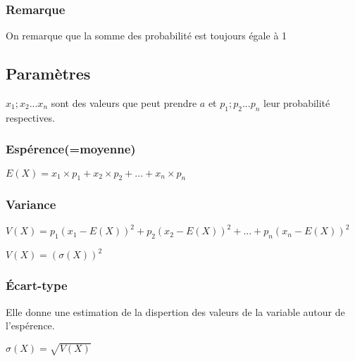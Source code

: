 \documentclass[a4paper,twoside,10pt,french,twocolumn]{scrartcl}
\begin{document}
\subsubsection{Remarque}
On remarque que la somme des probabilité est toujours égale à 1
\subsection{Paramètres}
$x_1;x_2...x_n$ sont des valeurs que peut prendre $a$ et $p_1;p_2...p_n$ leur probabilité respectives.
\subsubsection{Espérence\:(=\:moyenne)}
$E(X) = x_1 \times p_1 + x_2 \times p_2 +...+ x_n \times p_n$
\subsubsection{Variance}
$V(X) = p_1(x_1-E(X))^2+p_2(x_2-E(X))^2+...+p_n(x_n-E(X))^2$

$V(X) = (\sigma(X))^2$
\subsubsection{Écart-type}
Elle donne une estimation de la dispertion des valeurs de la variable autour de l'espérence.

$\sigma(X)=\sqrt{V(X)}$
\end{document}
